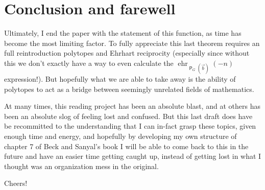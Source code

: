 \documentclass{amsart}
\DeclareMathOperator{\Z}{\mathbb{Z}}
\DeclareMathOperator{\sfP}{\mathsf{P}}
\DeclareMathOperator{\sgehr}{ehr}
\theoremstyle{plain}
\theoremstyle{remark}
\theoremstyle{definition}
\begin{document}
\hrulefill

\section*{Conclusion and farewell}

Ultimately, I end the paper with the statement of this function, as time
has become the most limiting factor. To fully appreciate this last theorem
requires an full reintroduction polytopes and Ehrhart reciprocity (especially
since without this we don't exactly have a way to even calculate
the $\sgehr_{\sfP_G(\vec b)}(-n)$ expression!).
But hopefully what we are able to take away is the ability of polytopes to
act as a bridge between seemingly unrelated fields of mathematics.

At many times, this reading project has been an absolute blast, and at others
has been an absolute slog of feeling lost and confused. But this last draft
does have be recommitted to the understanding that I can in-fact grasp these
topics, given enough time and energy, and hopefully by developing my own
structure of chapter 7 of Beck and Sanyal's book I will be able to come back to
this in the future and have an easier time getting caught up, instead of getting
lost in what I thought was an organization mess in the original.

Cheers!


\end{document}
